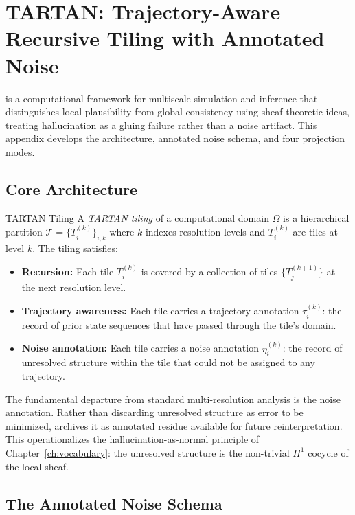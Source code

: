 \chapter{TARTAN: Trajectory-Aware Recursive Tiling with Annotated Noise}
\label{app:tartan}

\noindent \TARTAN is a computational framework for multiscale simulation and
inference that distinguishes local plausibility from global consistency using
sheaf-theoretic ideas, treating hallucination as a gluing failure rather than
a noise artifact. This appendix develops the architecture, annotated noise
schema, and four projection modes.

\section{Core Architecture}

\begin{definition}{TARTAN Tiling}
A \emph{TARTAN tiling} of a computational domain $\Omega$ is a hierarchical
partition $\mathcal{T} = \{T_i^{(k)}\}_{i,k}$ where $k$ indexes resolution
levels and $T_i^{(k)}$ are tiles at level $k$. The tiling satisfies:
\begin{itemize}
  \item \textbf{Recursion:} Each tile $T_i^{(k)}$ is covered by a collection
    of tiles $\{T_j^{(k+1)}\}$ at the next resolution level.
  \item \textbf{Trajectory awareness:} Each tile carries a trajectory annotation
    $\tau_i^{(k)}$: the record of prior state sequences that have passed through
    the tile's domain.
  \item \textbf{Noise annotation:} Each tile carries a noise annotation
    $\eta_i^{(k)}$: the record of unresolved structure within the tile that
    could not be assigned to any trajectory.
\end{itemize}
\end{definition}

The fundamental departure from standard multi-resolution analysis is the noise
annotation. Rather than discarding unresolved structure as error to be minimized,
\TARTAN archives it as annotated residue available for future reinterpretation.
This operationalizes the hallucination-as-normal principle of
Chapter~\ref{ch:vocabulary}: the unresolved structure is the non-trivial $H^1$
cocycle of the local sheaf.

\section{The Annotated Noise Schema}

